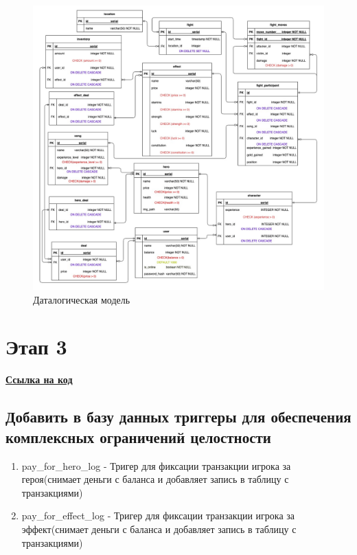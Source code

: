 \begin{figure}[H]
	\begin{center}
		\includegraphics[scale=0.44]{images/Datalogical.jpg}
		\caption{Даталогическая модель}
		\label{pic:pic_name} %
	\end{center}
\end{figure}

\newpage

\section*{Этап 3}

\faGithub\href{https://github.com/Vakzu/musical-wars-backend/tree/main/src/main/resources/sql_scripts}{\textbf{Ссылка на код}}

\subsection*{Добавить в базу данных триггеры для обеспечения комплексных ограничений
целостности}


\begin{enumerate}
    \item pay\_for\_hero\_log 
    - Тригер для фиксации транзакции игрока за героя(снимает деньги с баланса и добавляет запись в таблицу с транзакциями)

    \item pay\_for\_effect\_log
    - Тригер для фиксации транзакции игрока за эффект(снимает деньги с баланса и добавляет запись в таблицу с транзакциями)
\end{enumerate}

